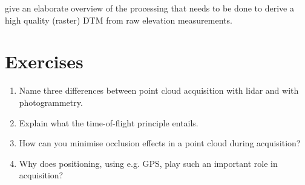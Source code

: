 \citet{Reuter09} give an elaborate overview of the processing that needs to be done to derive a high quality (raster) DTM from raw elevation measurements.


%
\section{Exercises}

\begin{enumerate}
	\item Name three differences between point cloud acquisition with lidar and with photogrammetry.
	\item Explain what the time-of-flight principle entails.
	\item How can you minimise occlusion effects in a point cloud during acquisition?
	\item Why does positioning, using e.g. GPS, play such an important role in acquisition?
\end{enumerate}
